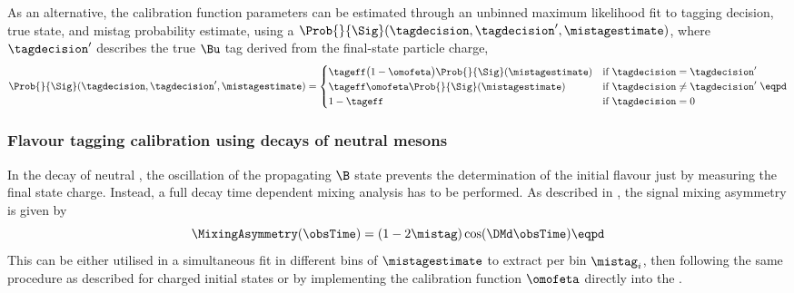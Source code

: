 As an alternative, the calibration function parameters can be estimated through
an unbinned maximum likelihood fit to tagging decision, true state, and mistag
probability estimate, using a \PDF
$\Prob{}{\Sig}(\tagdecision,\tagdecision^\prime,\mistagestimate)$, where
$\tagdecision^\prime$ describes the true $\Bu$ tag derived from the final-state
particle charge,
%
\begin{equation}\label{eq:flavour_tagging:calibration:method:charged:tagdefinition}
  \Prob{}{\Sig}(\tagdecision,\tagdecision^\prime,\mistagestimate) = 
  \begin{cases}
        \tageff \bigl(1-\omofeta\bigr) \Prob{}{\Sig}(\mistagestimate)    & \text{if $\tagdecision =    \tagdecision^\prime$} \\
        \tageff              \omofeta  \Prob{}{\Sig}(\mistagestimate)    & \text{if $\tagdecision \neq \tagdecision^\prime$} \\
    1 - \tageff                                                          & \text{if $\tagdecision = 0$} \\
  \end{cases} \eqpd
\end{equation}
%

\subsubsection[Flavour tagging calibration using decays of neutral \Bmesons]{Flavour tagging calibration using decays of neutral \Bbfsf mesons}
\label{sec:flavour_tagging:calibration:method:neutral}

In the decay of neutral \Bmesons, the oscillation of the propagating $\B$ state
prevents the determination of the initial flavour just by measuring the final
state charge. Instead, a full decay time dependent mixing analysis has to be
performed. As described \eg in \cite{Aaij:2012nt}, the signal mixing asymmetry is
given by
%
\begin{equation}
  \MixingAsymmetry(\obsTime) = (1 - 2\mistag)\cos(\DMd \obsTime)\eqpd
\end{equation}
%
This can be either utilised in a simultaneous fit in different bins of
$\mistagestimate$ to extract per bin $\mistag_i$, then following the same
procedure as described for charged initial states or by implementing the
calibration function $\omofeta$ directly into the \PDF.


